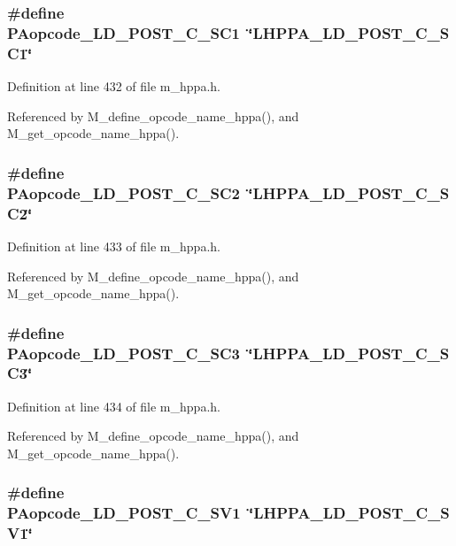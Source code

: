 \subsubsection{\setlength{\rightskip}{0pt plus 5cm}\#define PAopcode\_\-LD\_\-POST\_\-C\_\-SC1~\char`\"{}LHPPA\_\-LD\_\-POST\_\-C\_\-SC1\char`\"{}}\label{m__hppa_8h_22279f1206f55e3594d455f1be9fda5e}




Definition at line 432 of file m\_\-hppa.h.

Referenced by M\_\-define\_\-opcode\_\-name\_\-hppa(), and M\_\-get\_\-opcode\_\-name\_\-hppa().
\subsubsection{\setlength{\rightskip}{0pt plus 5cm}\#define PAopcode\_\-LD\_\-POST\_\-C\_\-SC2~\char`\"{}LHPPA\_\-LD\_\-POST\_\-C\_\-SC2\char`\"{}}\label{m__hppa_8h_e152ae0bac0a9d7a0911a2523e0af16e}




Definition at line 433 of file m\_\-hppa.h.

Referenced by M\_\-define\_\-opcode\_\-name\_\-hppa(), and M\_\-get\_\-opcode\_\-name\_\-hppa().
\subsubsection{\setlength{\rightskip}{0pt plus 5cm}\#define PAopcode\_\-LD\_\-POST\_\-C\_\-SC3~\char`\"{}LHPPA\_\-LD\_\-POST\_\-C\_\-SC3\char`\"{}}\label{m__hppa_8h_c893050d59688d8ff20017c0ef30033a}




Definition at line 434 of file m\_\-hppa.h.

Referenced by M\_\-define\_\-opcode\_\-name\_\-hppa(), and M\_\-get\_\-opcode\_\-name\_\-hppa().
\subsubsection{\setlength{\rightskip}{0pt plus 5cm}\#define PAopcode\_\-LD\_\-POST\_\-C\_\-SV1~\char`\"{}LHPPA\_\-LD\_\-POST\_\-C\_\-SV1\char`\"{}}\label{m__hppa_8h_41224356dfb518966b7ca7e5f5e5851b}




